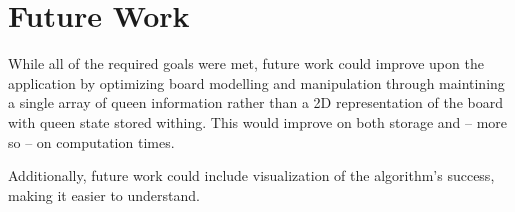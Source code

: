 \section{Future Work}
\label{section:futurework}
While all of the required goals were met, future work could improve upon the application by optimizing board modelling
and manipulation through maintining a single array of queen information rather than a 2D representation of the board
with queen state stored withing. This would improve on both storage and -- more so -- on computation times.

Additionally, future work could include visualization of the algorithm's success, making it easier to understand.
